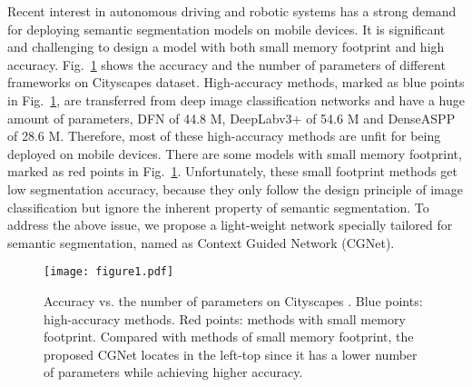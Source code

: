\documentclass[10pt,twocolumn,letterpaper]{article}
\begin{document}
Recent interest in autonomous driving and robotic systems has a strong demand for deploying semantic segmentation models on mobile devices. It is significant and challenging to design a model with both small memory footprint and high accuracy. Fig.~\ref{fig:fig1} shows the accuracy and the number of parameters of different frameworks on Cityscapes \cite{cordts2016cityscapes} dataset. High-accuracy methods, marked as blue points in Fig.~\ref{fig:fig1}, are transferred from deep image classification networks and have a huge amount of parameters, \eg DFN \cite{Yu_2018_CVPR} of 44.8 M,  DeepLabv3+ \cite{chen2018encoder} of 54.6 M and DenseASPP \cite{yang2018denseaspp} of 28.6 M.
Therefore, most of these high-accuracy methods are unfit for being deployed on mobile devices.
There are some models with small memory footprint, marked as red points in Fig.~\ref{fig:fig1}. Unfortunately, these small footprint methods get low segmentation accuracy, because they only follow the design principle of image classification but ignore the inherent property of semantic segmentation.
To address the above issue, we propose a light-weight network specially tailored for semantic segmentation, named as Context Guided Network (CGNet).



\begin{figure}[t]
\centering
\texttt{[image: figure1.pdf]}
\caption{Accuracy vs. the number of parameters on Cityscapes \cite{cordts2016cityscapes} \protect\footnotemark[1]. Blue points: high-accuracy methods.  Red points: methods with small memory footprint. Compared with methods of small memory footprint, the proposed CGNet locates in the left-top since it has a lower number of parameters while achieving higher accuracy.}
\label{fig:fig1}
\end{figure}
\end{document}
